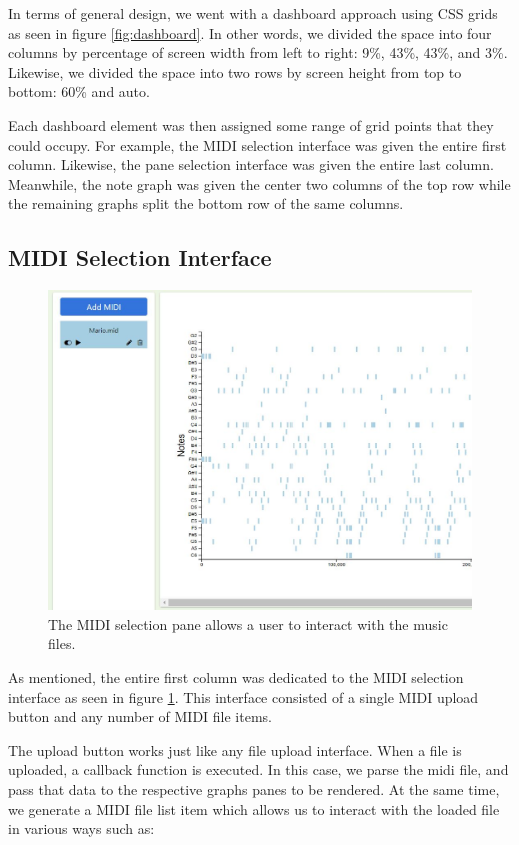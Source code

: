 \documentclass[journal]{vgtc}                %
\begin{document}
In terms of general design, we went with a dashboard approach using CSS grids
as seen in figure \ref{fig:dashboard}. In other words, we divided the space into
four columns by percentage of screen width from left to right: 9\%, 43\%, 43\%,
and 3\%. Likewise, we divided the space into two rows by screen height from top
to bottom: 60\% and auto.

Each dashboard element was then assigned some range of grid points that they
could occupy. For example, the MIDI selection interface was given the entire
first column. Likewise, the pane selection interface was given the entire
last column. Meanwhile, the note graph was given the center two columns of
the top row while the remaining graphs split the bottom row of the same
columns.

\subsection{MIDI Selection Interface}

\begin{figure}[h]
  \centering
  \includegraphics[width=\columnwidth]{midi-selection-single-track}
  \caption{The MIDI selection pane allows a user to interact with the music files.}
  \label{fig:midi-selection}
\end{figure}

As mentioned, the entire first column was dedicated to the MIDI selection
interface as seen in figure \ref{fig:midi-selection}. This interface consisted
of a single MIDI upload button and any number of MIDI file items.

The upload button works just like any file upload interface. When a file is
uploaded, a callback function is executed. In this case, we parse the midi file,
and pass that data to the respective graphs panes to be rendered. At the same
time, we generate a MIDI file list item which allows us to interact with the
loaded file in various ways such as:
\end{document}
